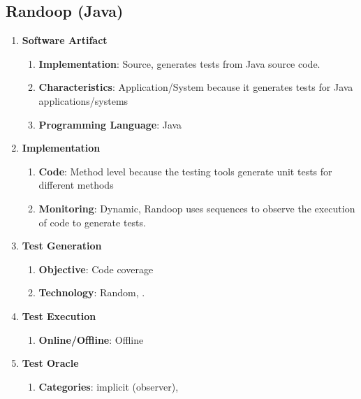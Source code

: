 \documentclass{article}
\begin{document}
\subsection{Randoop (Java)}
\begin{enumerate}
    \item \textbf{Software Artifact}
    \begin{enumerate}
        \item \textbf{Implementation}: Source, generates tests from Java source code.
        \item \textbf{Characteristics}: Application/System because it generates tests for Java applications/systems
        \item \textbf{Programming Language}: Java
    \end{enumerate}
    \item \textbf{Implementation}
    \begin{enumerate}
        \item \textbf{Code}: Method level because the testing tools generate unit tests for different methods
        \item \textbf{Monitoring}: Dynamic, Randoop uses sequences  \cite{pacheco2007feedback} to observe the execution of code to generate tests.
    \end{enumerate}
    \item \textbf{Test Generation}
    \begin{enumerate}
        \item \textbf{Objective}: Code coverage
        \item \textbf{Technology}: Random,  \cite{pacheco2007feedback}.
    \end{enumerate}
    \item \textbf{Test Execution}
    \begin{enumerate}
        \item \textbf{Online/Offline}: Offline
    \end{enumerate}
    \item \textbf{Test Oracle}
    \begin{enumerate}
        \item \textbf{Categories}: implicit (observer),  \cite{pacheco2007feedback}
    \end{enumerate}
\end{enumerate}

\hspace{0cm}
\newpage



\end{document}
